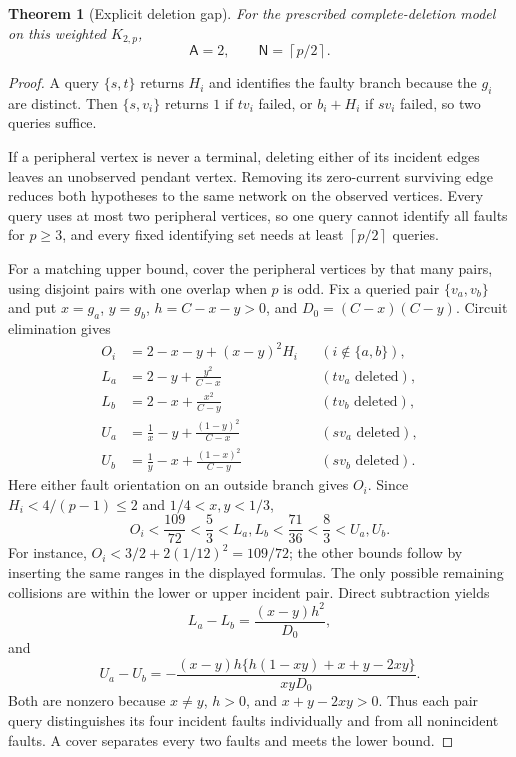 \documentclass[11pt,letterpaper]{article}
\newtheorem{theorem}{Theorem}
\newcommand{\ceil}[1]{\left\lceil #1\right\rceil}
\newcommand{\A}{\mathsf A}
\newcommand{\N}{\mathsf N}
\begin{document}
\begin{theorem}[Explicit deletion gap]\label{thm:weighted}
For the prescribed complete-deletion model on this weighted $K_{2,p}$,
\[
 \A=2,\qquad \N=\ceil{p/2}.
\]
\end{theorem}
\begin{proof}
A query $\{s,t\}$ returns $H_i$ and identifies the faulty branch because the $g_i$ are distinct. Then $\{s,v_i\}$ returns $1$ if $tv_i$ failed, or $b_i+H_i$ if $sv_i$ failed, so two queries suffice.

If a peripheral vertex is never a terminal, deleting either of its incident edges leaves an unobserved pendant vertex. Removing its zero-current surviving edge reduces both hypotheses to the same network on the observed vertices. Every query uses at most two peripheral vertices, so one query cannot identify all faults for $p\ge3$, and every fixed identifying set needs at least $\ceil{p/2}$ queries.

For a matching upper bound, cover the peripheral vertices by that many pairs, using disjoint pairs with one overlap when $p$ is odd. Fix a queried pair $\{v_a,v_b\}$ and put $x=g_a$, $y=g_b$, $h=C-x-y>0$, and $D_0=(C-x)(C-y)$. Circuit elimination gives
\begin{align*}
 O_i&=2-x-y+(x-y)^2H_i &&(i\notin\{a,b\}),\\
 L_a&=2-y+\frac{y^2}{C-x} &&(tv_a\text{ deleted}),\\
 L_b&=2-x+\frac{x^2}{C-y} &&(tv_b\text{ deleted}),\\
 U_a&=\frac1x-y+\frac{(1-y)^2}{C-x} &&(sv_a\text{ deleted}),\\
 U_b&=\frac1y-x+\frac{(1-x)^2}{C-y} &&(sv_b\text{ deleted}).
\end{align*}
Here either fault orientation on an outside branch gives $O_i$. Since $H_i<4/(p-1)\le2$ and $1/4<x,y<1/3$,
\[
 O_i<\frac{109}{72}<\frac53<L_a,L_b<\frac{71}{36}<\frac83<U_a,U_b.
\]
For instance, $O_i<3/2+2(1/12)^2=109/72$; the other bounds follow by inserting the same ranges in the displayed formulas. The only possible remaining collisions are within the lower or upper incident pair. Direct subtraction yields
\[
 L_a-L_b=\frac{(x-y)h^2}{D_0},
\]
and
\[
 U_a-U_b=-\frac{(x-y)h\{h(1-xy)+x+y-2xy\}}{xyD_0}.
\]
Both are nonzero because $x\ne y$, $h>0$, and $x+y-2xy>0$. Thus each pair query distinguishes its four incident faults individually and from all nonincident faults. A cover separates every two faults and meets the lower bound.
\end{proof}
\end{document}
